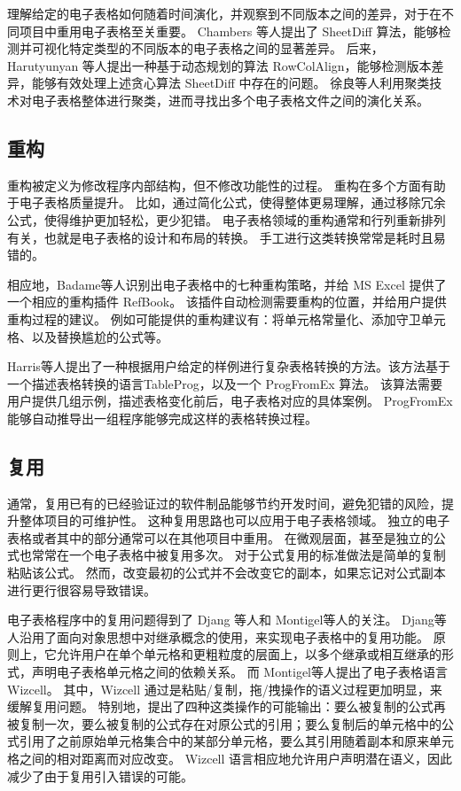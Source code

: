 理解给定的电子表格如何随着时间演化，并观察到不同版本之间的差异，对于在不同项目中重用电子表格至关重要。
Chambers 等人\cite{chambers2010sheetdiff}提出了 SheetDiff 算法，能够检测并可视化特定类型的不同版本的电子表格之间的显著差异。
后来，Harutyunyan 等人\cite{harutyunyan2012planted}提出一种基于动态规划的算法 RowColAlign，能够检测版本差异，能够有效处理上述贪心算法 SheetDiff 中存在的问题。
徐良等人\cite{xu2017spreadcluster}利用聚类技术对电子表格整体进行聚类，进而寻找出多个电子表格文件之间的演化关系。

\subsection{重构}
重构被定义为修改程序内部结构，但不修改功能性的过程\cite{o2010spreadsheet}。
重构在多个方面有助于电子表格质量提升。
比如，通过简化公式，使得整体更易理解，通过移除冗余公式，使得维护更加轻松，更少犯错。
电子表格领域的重构通常和行列重新排列有关，也就是电子表格的设计和布局的转换。
手工进行这类转换常常是耗时且易错的。

相应地，Badame等人\cite{badame2012refactoring}识别出电子表格中的七种重构策略，并给 MS Excel 提供了一个相应的重构插件 RefBook。
该插件自动检测需要重构的位置，并给用户提供重构过程的建议。
例如可能提供的重构建议有：将单元格常量化、添加守卫单元格、以及替换尴尬的公式等。

Harris等人\cite{harris2011spreadsheet}提出了一种根据用户给定的样例进行复杂表格转换的方法。该方法基于一个描述表格转换的语言TableProg，以及一个 ProgFromEx 算法。 
该算法需要用户提供几组示例，描述表格变化前后，电子表格对应的具体案例。
ProgFromEx 能够自动推导出一组程序能够完成这样的表格转换过程。

\subsection{复用}
通常，复用已有的已经验证过的软件制品能够节约开发时间，避免犯错的风险，提升整体项目的可维护性\cite{ye2005reuse}。
这种复用思路也可以应用于电子表格领域。
独立的电子表格或者其中的部分通常可以在其他项目中重用。
在微观层面，甚至是独立的公式也常常在一个电子表格中被复用多次。
对于公式复用的标准做法是简单的复制粘贴该公式。
然而，改变最初的公式并不会改变它的副本，如果忘记对公式副本进行更行很容易导致错误。

电子表格程序中的复用问题得到了 Djang 等人\cite{djang1998similarity}和 Montigel等人\cite{montigel2002portability}的关注。
Djang等人\cite{djang1998similarity}沿用了面向对象思想中对继承概念的使用，来实现电子表格中的复用功能。
原则上，它允许用户在单个单元格和更粗粒度的层面上，以多个继承或相互继承的形式，声明电子表格单元格之间的依赖关系。
而 Montigel等人\cite{montigel2002portability}提出了电子表格语言 Wizcell。
其中，Wizcell 通过是粘贴/复制，拖/拽操作的语义过程更加明显，来缓解复用问题。
特别地，提出了四种这类操作的可能输出：要么被复制的公式再被复制一次，要么被复制的公式存在对原公式的引用；要么复制后的单元格中的公式引用了之前原始单元格集合中的某部分单元格，要么其引用随着副本和原来单元格之间的相对距离而对应改变。
Wizcell 语言相应地允许用户声明潜在语义，因此减少了由于复用引入错误的可能。